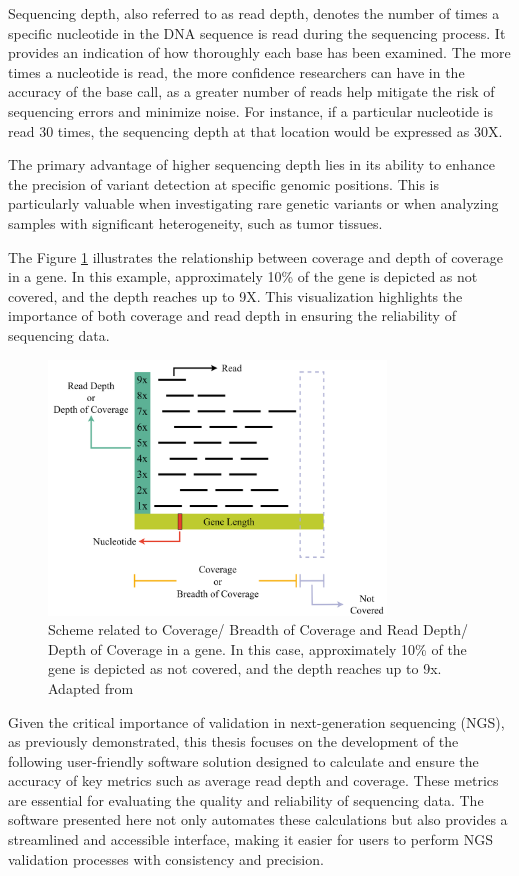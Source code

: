 Sequencing depth, also referred to as read depth, denotes the number of times a specific nucleotide in the DNA sequence is read during the sequencing process. It provides an indication of how thoroughly each base has been examined. The more times a nucleotide is read, the more confidence researchers can have in the accuracy of the base call, as a greater number of reads help mitigate the risk of sequencing errors and minimize noise. For instance, if a particular nucleotide is read 30 times, the sequencing depth at that location would be expressed as 30X. \cite{3billion2023}

The primary advantage of higher sequencing depth lies in its ability to enhance the precision of variant detection at specific genomic positions. This is particularly valuable when investigating rare genetic variants or when analyzing samples with significant heterogeneity, such as tumor tissues. \cite{3billion2023}

The Figure \ref{fig:depth_coverage} illustrates the relationship between coverage and depth of coverage in a gene. In this example, approximately 10\% of the gene is depicted as not covered, and the depth reaches up to 9X. This visualization highlights the importance of both coverage and read depth in ensuring the reliability of sequencing data.

\begin{figure}[H]
    \centering
    \includegraphics[width=0.8\textwidth]{figs/depth_coverage.png}
    \caption{Scheme related to Coverage/ Breadth of Coverage and Read Depth/ Depth of Coverage in a gene. In this case, approximately 10\% of the gene is depicted as not covered, and the depth reaches up to 9x. Adapted from \cite{MedGenome2020}} 
    \label{fig:depth_coverage}
\end{figure}

Given the critical importance of validation in next-generation sequencing (NGS), as previously demonstrated, this thesis focuses on the development of the following user-friendly software solution designed to calculate and ensure the accuracy of key metrics such as average read depth and coverage. These metrics are essential for evaluating the quality and reliability of sequencing data. The software presented here not only automates these calculations but also provides a streamlined and accessible interface, making it easier for users to perform NGS validation processes with consistency and precision.



